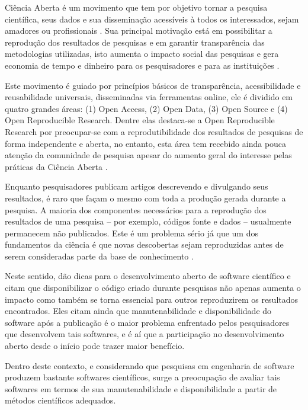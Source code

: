 Ciência Aberta é um movimento que tem por objetivo tornar a pesquisa
científica, seus dados e sua disseminação acessíveis à todos os interessados,
sejam amadores ou profissionais \cite{WikipediaOpenScience}. Sua principal
motivação está em possibilitar a reprodução dos resultados de pesquisas e em
garantir transparência das metodologias utilizadas, isto aumenta o impacto
social das pesquisas e gera economia de tempo e dinheiro para os pesquisadores
e para as instituições \cite{Nesta2010}.

Este movimento é guiado por princípios básicos de transparência, acessibilidade
e reusabilidade universais, disseminadas via ferramentas online, ele é dividido
em quatro grandes áreas: (1) Open Access, (2) Open Data, (3) Open Source e (4)
Open Reproducible Research. Dentre elas destaca-se a Open Reproducible Research
por preocupar-se com a reprodutibilidade dos resultados de pesquisas de forma
independente \cite{Stodden2009} e aberta, no entanto, esta área tem recebido
ainda pouca atenção da comunidade de pesquisa \cite{Nancy2015}
\cite{Grand2010Open} apesar do aumento geral do interesse pelas práticas da
Ciência Aberta \cite{Grand2010}.

Enquanto pesquisadores publicam artigos descrevendo e divulgando seus
resultados, é raro que façam o mesmo com toda a produção gerada durante a
pesquisa. A maioria dos componentes necessários para a reprodução dos
resultados de uma pesquisa -- por exemplo, códigos fonte e dados -- usualmente
permanecem não publicados. Este é um problema sério já que um dos fundamentos
da ciência é que novas descobertas sejam reproduzidas antes de serem
consideradas parte da base de conhecimento \cite{Stodden2009}.

Neste sentido,  dão dicas para o desenvolvimento aberto
de software científico e citam que disponibilizar o código criado durante
pesquisas não apenas aumenta o impacto como também se torna essencial para
outros reproduzirem os resultados encontrados. Eles citam ainda que
manutenabilidade e disponibilidade do software após a publicação é o maior
problema enfrentado pelos pesquisadores que desenvolvem tais softwares, e é aí
que a participação no desenvolvimento aberto desde o início pode trazer maior
benefício.

Dentro deste contexto, e considerando que pesquisas em engenharia de software
produzem bastante softwares científicos, surge a preocupação de avaliar tais
softwares em termos de sua manutenabilidade e disponibilidade a partir de
métodos científicos adequados.

